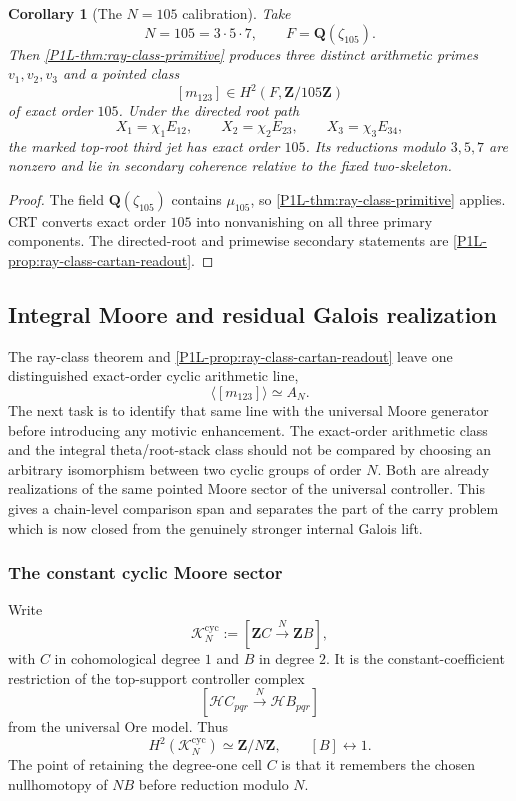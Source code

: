 \documentclass[11pt]{article}
\newtheorem{corollary}[theorem]{Corollary}
\theoremstyle{remark}
\newcommand{\Z}{\mathbf Z}
\providecommand{\Q}{\mathbf Q}
\providecommand{\Hh}{\mathcal H}
\begin{document}
\begin{corollary}[The \(N=105\) calibration]
\label{P1L-cor:N105}
Take
\[
 \boxed{N=105=3\cdot5\cdot7,\qquad F=\Q(\zeta_{105}).}
\]
Then \cref{P1L-thm:ray-class-primitive} produces three distinct arithmetic
primes \(v_1,v_2,v_3\) and a pointed class
\[
 [m_{123}]\in H^2(F,\Z/105\Z)
\]
of exact order \(105\).  Under the directed root path
\[
 X_1=\chi_1E_{12},\qquad X_2=\chi_2E_{23},\qquad X_3=\chi_3E_{34},
\]
the marked top-root third jet has exact order \(105\).  Its reductions
modulo \(3,5,7\) are nonzero and lie in secondary coherence relative to the
fixed two-skeleton.
\end{corollary}

\begin{proof}
The field \(\Q(\zeta_{105})\) contains \(\mu_{105}\), so
\cref{P1L-thm:ray-class-primitive} applies.  CRT converts exact order \(105\)
into nonvanishing on all three primary components.  The directed-root and primewise secondary statements are
\cref{P1L-prop:ray-class-cartan-readout}.
\end{proof}


\subsection{Integral Moore and residual Galois realization}\label{P1L-sec:moore-comparison}

The ray-class theorem and \cref{P1L-prop:ray-class-cartan-readout} leave one
distinguished exact-order cyclic arithmetic line,
\[
 \langle[m_{123}]\rangle\simeq A_N.
\]
The next task is to identify that same line with the universal Moore
generator before introducing any motivic enhancement.  The exact-order
arithmetic class and the integral theta/root-stack class should not be
compared by choosing an arbitrary isomorphism between two cyclic groups of
order $N$.  Both are already realizations of the same pointed Moore sector of the universal controller.  This gives a chain-level comparison span and separates the part of the carry problem which is now closed from the genuinely stronger internal Galois lift.

\subsubsection{The constant cyclic Moore sector}

Write
\begin{equation}\label{P1L-eq:cyclic-moore}
 \mathcal K_N^{\mathrm{cyc}}
 :=[\Z C\xrightarrow{\,N\,}\Z B],
\end{equation}
with $C$ in cohomological degree $1$ and $B$ in degree $2$.  It is the constant-coefficient restriction of the top-support controller complex
\[
 [\Hh C_{pqr}\xrightarrow{\,N\,}\Hh B_{pqr}]
\]
from the universal Ore model.  Thus
\[
 H^2(\mathcal K_N^{\mathrm{cyc}})\simeq \Z/N\Z,
 \qquad [B]\longleftrightarrow1.
\]
The point of retaining the degree-one cell $C$ is that it remembers the chosen nullhomotopy of $NB$ before reduction modulo $N$.
\end{document}

